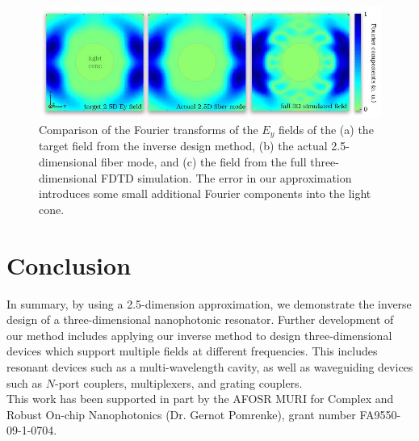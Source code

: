 \documentclass[10pt,letterpaper]{article}
\begin{document}
\begin{figure}[hbt]
\centering\includegraphics[width=\textwidth]{qcomp}
\caption{Comparison of the Fourier transforms of the $E_y$ fields of the (a) the target field from the inverse design method, (b) the actual 2.5-dimensional fiber mode, and (c) the field from the full three-dimensional FDTD simulation. The error in our approximation introduces some small additional Fourier components into the light cone.}\label{qcomp}
\end{figure}

\section{Conclusion}
In summary, by using a 2.5-dimension approximation, we demonstrate the inverse design of a three-dimensional nanophotonic resonator. Further development of our method includes applying our inverse method to design three-dimensional devices which support multiple fields at different frequencies. This includes resonant devices such as a multi-wavelength cavity, as well as waveguiding devices such as $N$-port couplers, multiplexers, and grating couplers.\\

This work has been supported in part by the AFOSR MURI for Complex and Robust On-chip Nanophotonics (Dr. Gernot Pomrenke), grant number FA9550-09-1-0704.
\end{document}
